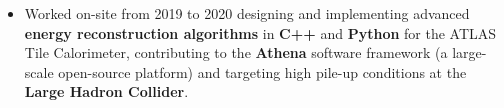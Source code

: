\documentclass[10pt,a4paper,ragged2e]{altacv}
\begin{document}
\begin{itemize}
    \item Worked on-site from 2019 to 2020 designing and implementing advanced \textbf{energy reconstruction algorithms} in \textbf{C++} and \textbf{Python} for the ATLAS Tile Calorimeter, contributing to the \textbf{Athena} software framework (a large-scale open-source platform) and targeting high pile-up conditions at the \textbf{Large Hadron Collider}.
\end{itemize}
\end{document}
